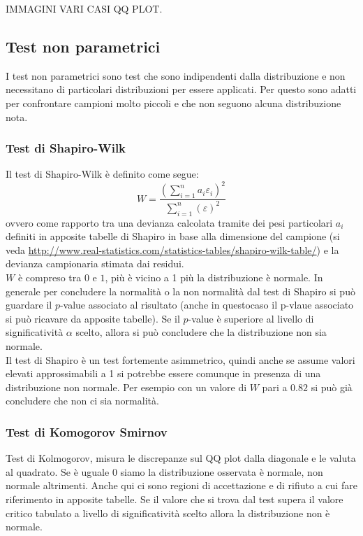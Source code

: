 IMMAGINI VARI CASI QQ PLOT.

\subsection{Test non parametrici}
I test non parametrici sono test che sono indipendenti dalla distribuzione e non necessitano di particolari distribuzioni per essere applicati. Per questo sono adatti per confrontare campioni molto piccoli e che non seguono alcuna distribuzione nota.

\subsubsection{Test di Shapiro-Wilk}
Il test di Shapiro-Wilk è definito come segue:
\begin{equation}
W = \frac{(\sum_{i=1}^{n} a_i \varepsilon_i)^2}{\sum_{i=1}^{n} (\varepsilon)^2}
\end{equation}
ovvero come rapporto tra una devianza calcolata tramite dei pesi particolari $a_i$ definiti in apposite tabelle di Shapiro in base alla dimensione del campione (si veda \url{http://www.real-statistics.com/statistics-tables/shapiro-wilk-table/}) e la devianza campionaria stimata dai residui.\\
$W$ è compreso tra $0$ e $1$, più è vicino a 1 più la distribuzione è normale. In generale per concludere la normalità o la non normalità dal test di Shapiro si può guardare il $p$-value associato al risultato (anche in questocaso il p-vlaue associato si può ricavare da apposite tabelle). Se il $p$-value è superiore al livello di significatività $\alpha$ scelto, allora si può concludere che la distribuzione non sia normale.\\
Il test di Shapiro è un test fortemente asimmetrico, quindi anche se assume valori elevati approssimabili a 1 si potrebbe essere comunque in presenza di una distribuzione non normale. Per esempio con un valore di $W$ pari a $0.82$ si può già concludere che non ci sia normalità.

\subsubsection{Test di Komogorov Smirnov}
Test di Kolmogorov, misura le discrepanze sul QQ plot dalla diagonale e le valuta al quadrato. Se è uguale 0 siamo la distribuzione osservata è normale, non normale altrimenti. Anche qui ci sono regioni di accettazione e di rifiuto a cui fare riferimento in apposite tabelle. Se il valore che si trova dal test supera il valore critico tabulato a livello di significatività scelto allora la distribuzione non è normale.

